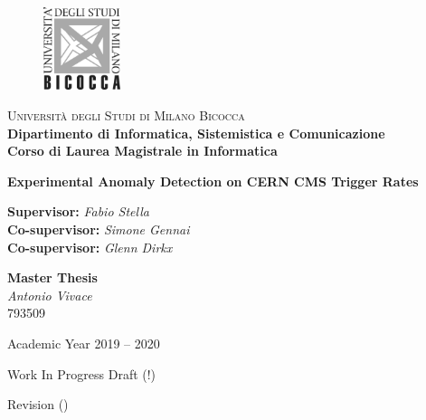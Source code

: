 
\thispagestyle{empty}

\begin{figure}
	\vspace*{-8mm}
	\centering
	\includegraphics[width=0.20\textwidth]{logo-bicocca.jpg}
\end{figure}
\large \noindent \textsc{Università degli Studi di Milano Bicocca} \\
\textbf{Dipartimento di Informatica, Sistemistica e Comunicazione \\
	Corso di Laurea Magistrale in Informatica}

\vfill


\begin{center}
	{\Huge \textbf{Experimental Anomaly Detection on CERN CMS Trigger Rates}}
\end{center}

\vfill

\begin{flushleft}
	{\Large \textbf{Supervisor:} \textit{Fabio Stella} \\
		\textbf{Co-supervisor:} \textit{Simone Gennai} \\
		\textbf{Co-supervisor:} \textit{Glenn Dirkx}}
\end{flushleft}

\vspace{8mm}
\par

\begin{flushright}
	{\Large \textbf{Master Thesis} \\
		\textit{Antonio Vivace} \\ 793509}
\end{flushright}

\vfill
\par

\begin{center}
	{\large Academic Year 2019 -- 2020}

	\hfill\linebreak
	Work In Progress Draft (!)

	Revision \texttt{\revision} (\texttt{\revisiondate})
\end{center}

\clearpage